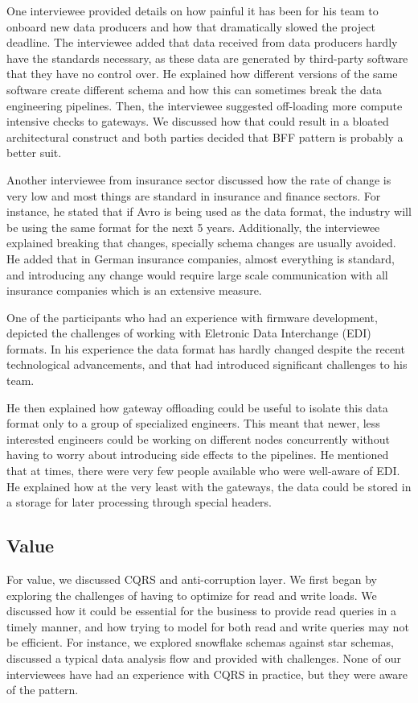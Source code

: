 \documentclass{bmcart}
\begin{document}
One interviewee provided details on how painful it has been for his team to onboard new data producers and how that dramatically slowed the project deadline. The interviewee added that data received from data producers hardly have the standards necessary, as these data are generated by third-party software that they have no control over. He explained how different versions of the same software create different schema and how this can sometimes break the data engineering pipelines. Then, the interviewee suggested off-loading more compute intensive checks to gateways. We discussed how that could result in a bloated architectural construct and both parties decided that BFF pattern is probably a better suit.  

Another interviewee from insurance sector discussed how the rate of change is very low and most things are standard in insurance and finance sectors. For instance, he stated that if Avro is being used as the data format, the industry will be using the same format for the next 5 years. Additionally, the interviewee explained breaking that changes, specially schema changes are usually avoided. He added that in German insurance companies, almost everything is standard, and introducing any change would require large scale communication with all insurance companies which is an extensive measure. 

One of the participants who had an experience with firmware development, depicted the challenges of working with Eletronic Data Interchange (EDI) formats. In his experience the data format has hardly changed despite the recent technological advancements, and that had introduced significant challenges to his team. 

He then explained how gateway offloading could be useful to isolate this data format only to a group of specialized engineers. This meant that newer, less interested engineers could be working on different nodes concurrently without having to worry about introducing side effects to the pipelines. He mentioned that at times, there were very few people available who were well-aware of EDI. He explained how at the very least with the gateways, the data could be stored in a storage for later processing through special headers. 



\subsection{Value}

For value, we discussed CQRS and anti-corruption layer. We first began by exploring the challenges of having to optimize for read and write loads. We discussed how it could be essential for the business to provide read queries in a timely manner, and how trying to model for both read and write queries may not be efficient. For instance, we explored snowflake schemas against star schemas, discussed a typical data analysis flow and provided with challenges. None of our interviewees have had an experience with CQRS in practice, but they were aware of the pattern. 
\end{document}
